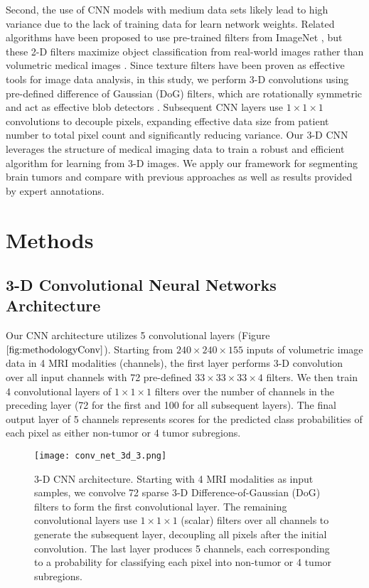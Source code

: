 \documentclass{llncs}
\begin{document}
\indent Second, the use of CNN models with medium data sets likely lead to high variance due to the lack of training data for learn network weights. Related algorithms have been proposed to use pre-trained filters from ImageNet \cite{Deng09}, but these 2-D filters maximize object classification from real-world images rather than volumetric medical images \cite{Deng09,Krizhevsky12,Bar15}. Since texture filters have been proven as effective tools for image data analysis, in this study, we perform 3-D convolutions using pre-defined difference of Gaussian (DoG) filters, which are rotationally symmetric and act as effective blob detectors \cite{sift}.  Subsequent CNN layers use $1 \times 1 \times 1$ convolutions to decouple pixels, expanding effective data size from patient number to total pixel count and significantly reducing variance. Our 3-D CNN leverages the structure of medical imaging data to train a robust and efficient algorithm for learning from 3-D images. We apply our framework for segmenting brain tumors and compare with previous approaches as well as results provided by expert annotations. 



\section{Methods}
\subsection{3-D Convolutional Neural Networks Architecture}
Our CNN architecture utilizes 5 convolutional layers (Figure $\ref{fig:methodologyConv}$).  Starting from $240 \times 240 \times 155$ inputs of volumetric image data in 4 MRI modalities (channels), the first layer performs 3-D convolution over all input channels with 72 pre-defined $33 \times 33 \times 33 \times 4$ filters. We then train 4 convolutional layers of $1 \times 1 \times 1$ filters over the number of channels in the preceding layer (72 for the first and 100 for all subsequent layers). The final output layer of 5 channels represents scores for the predicted class probabilities of each pixel as either non-tumor or 4 tumor subregions.
\begin{figure}[htb]
	\centering
	\texttt{[image: conv\_net\_3d\_3.png]}
	\caption{{3-D CNN architecture.} \small{Starting with 4 MRI modalities as input samples, we convolve 72 sparse 3-D Difference-of-Gaussian (DoG) filters to form the first convolutional layer.  The remaining convolutional layers use $1 \times 1 \times 1$ (scalar) filters over all channels to generate the subsequent layer, decoupling all pixels after the initial convolution.  The last layer produces 5 channels, each corresponding to a probability for classifying each pixel into non-tumor or 4 tumor subregions. }}
	\label{fig:methodologyConv}
\end{figure}
\end{document}
